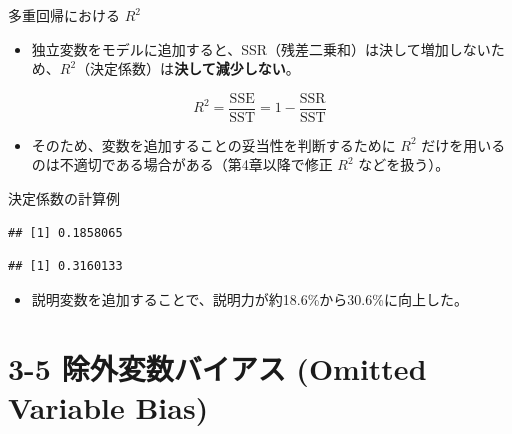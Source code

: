 \documentclass[
  ignorenonframetext,
]{beamer}
\newenvironment{Shaded}{\begin{snugshade}}{\end{snugshade}}
\newcommand{\FunctionTok}[1]{\textcolor[rgb]{0.00,0.00,0.00}{#1}}
\newcommand{\NormalTok}[1]{#1}
\newcommand{\SpecialCharTok}[1]{\textcolor[rgb]{0.00,0.00,0.00}{#1}}
\providecommand{\tightlist}{%
  \setlength{\itemsep}{0pt}\setlength{\parskip}{0pt}}
\begin{document}
\begin{frame}{多重回帰における \(R^2\)}
\protect\hypertarget{ux591aux91cdux56deux5e30ux306bux304aux3051ux308b-r2}{}
\begin{itemize}
\tightlist
\item
  独立変数をモデルに追加すると、SSR（残差二乗和）は決して増加しないため、\(R^2\)（決定係数）は\textbf{決して減少しない}。
\end{itemize}

\[ R^2 = \frac{\text{SSE}}{\text{SST}} = 1 - \frac{\text{SSR}}{\text{SST}} \]

\begin{itemize}
\tightlist
\item
  そのため、変数を追加することの妥当性を判断するために \(R^2\)
  だけを用いるのは不適切である場合がある（第4章以降で修正 \(R^2\)
  などを扱う）。
\end{itemize}
\end{frame}

\begin{frame}[fragile]{決定係数の計算例}
\protect\hypertarget{ux6c7aux5b9aux4fc2ux6570ux306eux8a08ux7b97ux4f8b}{}
\begin{Shaded}
\end{Shaded}

\begin{verbatim}
## [1] 0.1858065
\end{verbatim}

\begin{Shaded}
\end{Shaded}

\begin{verbatim}
## [1] 0.3160133
\end{verbatim}

\begin{itemize}
\tightlist
\item
  説明変数を追加することで、説明力が約18.6\%から30.6\%に向上した。
\end{itemize}
\end{frame}

\hypertarget{ux9664ux5916ux5909ux6570ux30d0ux30a4ux30a2ux30b9-omitted-variable-bias}{%
\section{3-5 除外変数バイアス (Omitted Variable
Bias)}\label{ux9664ux5916ux5909ux6570ux30d0ux30a4ux30a2ux30b9-omitted-variable-bias}}
\end{document}

